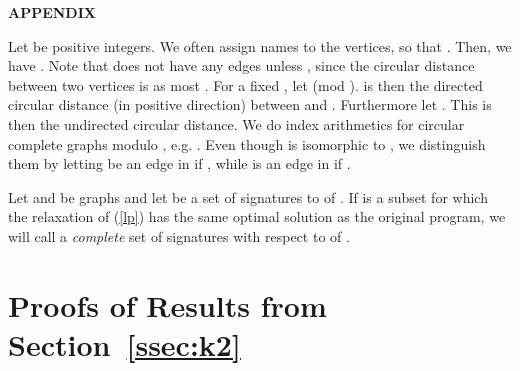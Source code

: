 \documentclass[11pt,a4paper]{article}
\begin{document}


\newpage

\appendix
\begin{center}
  {\bf APPENDIX}
\end{center}




\noindent
Let   be positive integers. We often assign names to the vertices, so that . Then, we have . Note that  does not have any edges unless , since the circular distance between two vertices is as most . 
For a fixed , let  (mod ).  is then the directed circular distance (in positive direction) between  and . Furthermore let . This is then the undirected circular distance. We do index arithmetics for circular complete graphs modulo , e.g.
. Even though  is isomorphic to , we distinguish them by letting  be an edge in  if , while  is an edge in  if .

Let  and  be graphs and
let  be a set of signatures to  of .
If  is a subset for which the relaxation of (\ref{lp}) 
has the same optimal solution as the original program,
we will call  a \emph{complete} set of signatures with respect to
 of .

\section{Proofs of Results from Section~\ref{ssec:k2}}
\end{document}
